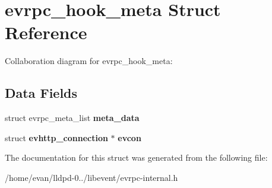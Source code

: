 \section{evrpc\-\_\-hook\-\_\-meta \-Struct \-Reference}
\label{structevrpc__hook__meta}


\-Collaboration diagram for evrpc\-\_\-hook\-\_\-meta\-:
\subsection*{\-Data \-Fields}
\begin{DoxyCompactItemize}
\item 
struct evrpc\-\_\-meta\-\_\-list {\bfseries meta\-\_\-data}\label{structevrpc__hook__meta_abeadade4bdc256debbc13dc63c88b482}

\item 
struct {\bf evhttp\-\_\-connection} $\ast$ {\bfseries evcon}\label{structevrpc__hook__meta_a507c84afa3bb93e17efc8aecd1bf18d2}

\end{DoxyCompactItemize}


\-The documentation for this struct was generated from the following file\-:\begin{DoxyCompactItemize}
\item 
/home/evan/lldpd-\/0../libevent/evrpc-\/internal.\-h\end{DoxyCompactItemize}
